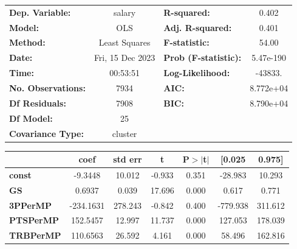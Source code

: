 \begin{center}
\begin{tabular}{lclc}
\toprule
\textbf{Dep. Variable:}             &      salary      & \textbf{  R-squared:         } &     0.402   \\
\textbf{Model:}                     &       OLS        & \textbf{  Adj. R-squared:    } &     0.401   \\
\textbf{Method:}                    &  Least Squares   & \textbf{  F-statistic:       } &     54.00   \\
\textbf{Date:}                      & Fri, 15 Dec 2023 & \textbf{  Prob (F-statistic):} & 5.47e-190   \\
\textbf{Time:}                      &     00:53:51     & \textbf{  Log-Likelihood:    } &   -43833.   \\
\textbf{No. Observations:}          &        7934      & \textbf{  AIC:               } & 8.772e+04   \\
\textbf{Df Residuals:}              &        7908      & \textbf{  BIC:               } & 8.790e+04   \\
\textbf{Df Model:}                  &          25      & \textbf{                     } &             \\
\textbf{Covariance Type:}           &     cluster      & \textbf{                     } &             \\
\bottomrule
\end{tabular}
\begin{tabular}{lcccccc}
                                    & \textbf{coef} & \textbf{std err} & \textbf{t} & \textbf{P$> |$t$|$} & \textbf{[0.025} & \textbf{0.975]}  \\
\midrule
\textbf{const}                      &      -9.3448  &       10.012     &    -0.933  &         0.351        &      -28.983    &       10.293     \\
\textbf{GS}                         &       0.6937  &        0.039     &    17.696  &         0.000        &        0.617    &        0.771     \\
\textbf{3PPerMP}                    &    -234.1631  &      278.243     &    -0.842  &         0.400        &     -779.938    &      311.612     \\
\textbf{PTSPerMP}                   &     152.5457  &       12.997     &    11.737  &         0.000        &      127.053    &      178.039     \\
\textbf{TRBPerMP}                   &     110.6563  &       26.592     &     4.161  &         0.000        &       58.496    &      162.816     \\

\end{tabular}
\end{center}
